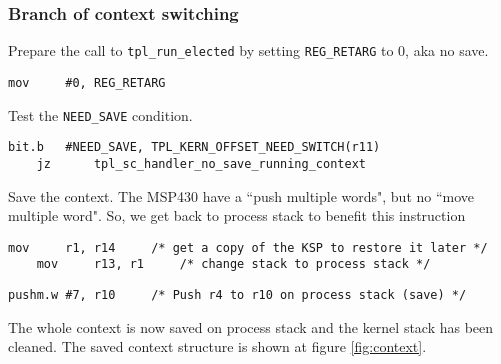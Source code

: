 \documentclass[11pt, oneside]{article}   	%
\begin{document}
\subsubsection{Branch of context switching}

Prepare the call to \lstinline{tpl_run_elected} by setting \lstinline{REG_RETARG} to 0, aka no save.
\begin{lstlisting}[backgroundcolor=\color{red!15}]
    mov     #0, REG_RETARG
\end{lstlisting}

Test the \lstinline{NEED_SAVE} condition.

\begin{lstlisting}[backgroundcolor=\color{red!15}]
    bit.b   #NEED_SAVE, TPL_KERN_OFFSET_NEED_SWITCH(r11)
    jz      tpl_sc_handler_no_save_running_context
\end{lstlisting}
Save the context. The MSP430 have a ``push multiple words", but no ``move multiple word". So, we get back to process stack to benefit this instruction

\begin{lstlisting}[backgroundcolor=\color{red!15}]
    mov     r1, r14     /* get a copy of the KSP to restore it later */
    mov     r13, r1     /* change stack to process stack */	
\end{lstlisting}
\vspace{-1em}
\begin{lstlisting}[backgroundcolor=\color{yellow!15}]
    pushm.w #7, r10     /* Push r4 to r10 on process stack (save) */
\end{lstlisting}


The whole context is now saved on process stack and the kernel stack has been cleaned. The saved context structure is shown at figure \ref{fig:context}.
\end{document}
